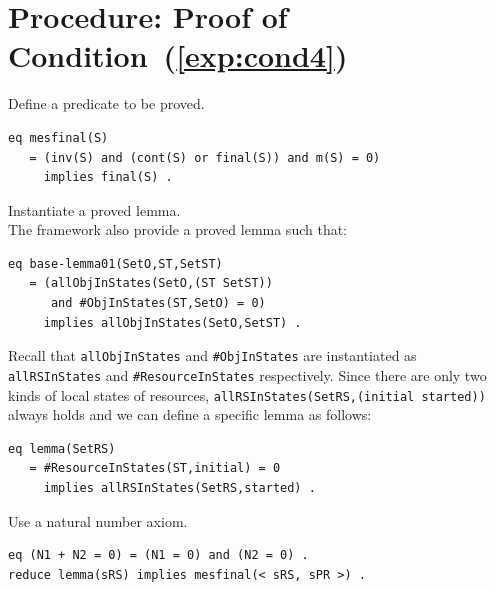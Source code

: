 \documentclass[12pt]{report}
\newcommand{\stt}[1]{{\small{\tt {#1}}}}
\begin{document}
\section{Procedure: Proof of Condition~(\ref{exp:cond4})}
\label{sec:mesfinal}
 Define a predicate to be proved.
\begin{verbatim}
eq mesfinal(S)
   = (inv(S) and (cont(S) or final(S)) and m(S) = 0)
     implies final(S) .
\end{verbatim}
 Instantiate a proved lemma. \\
The framework also provide a proved lemma such that:
\begin{verbatim}
eq base-lemma01(SetO,ST,SetST)
   = (allObjInStates(SetO,(ST SetST)) 
      and #ObjInStates(ST,SetO) = 0)
     implies allObjInStates(SetO,SetST) .
\end{verbatim}
Recall that {\tt allObjInStates} and {\tt \#ObjInStates} are instantiated
as {\tt allRSInStates} and {\tt \#ResourceInStates} respectively.
Since there are only two kinds of local states of resources,
\stt{allRSInStates(SetRS,(initial started))} always holds and
we can define a specific lemma as follows:
\begin{verbatim}
eq lemma(SetRS)
   = #ResourceInStates(ST,initial) = 0 
     implies allRSInStates(SetRS,started) .
\end{verbatim}
 Use a natural number axiom.
\begin{verbatim}
eq (N1 + N2 = 0) = (N1 = 0) and (N2 = 0) .
reduce lemma(sRS) implies mesfinal(< sRS, sPR >) .
\end{verbatim}

\end{document}
